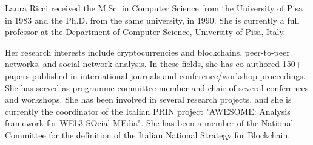 \documentclass{ieeeaccess}
\begin{document}
\begin{IEEEbiography}{Laura Ricci} received the M.Sc. in Computer Science from the University of Pisa in 1983 and the Ph.D. from the same university, in 1990. She is currently a full professor at the Department of Computer Science, University of Pisa, Italy.
\par
Her research interests include cryptocurrencies and blockchains, peer-to-peer networks, and social network analysis. In these fields, she has co-authored 150+ papers published in international journals and conference/workshop proceedings. She has served as programme committee member and chair of several conferences and workshops. She has been involved in several research projects, and she is currently the coordinator of the Italian PRIN project "AWESOME: Analysis framework for WEb3 SOcial MEdia". She has been a member of the National Committee for the definition of the Italian National Strategy for Blockchain.
\end{IEEEbiography}

\EOD
\end{document}
